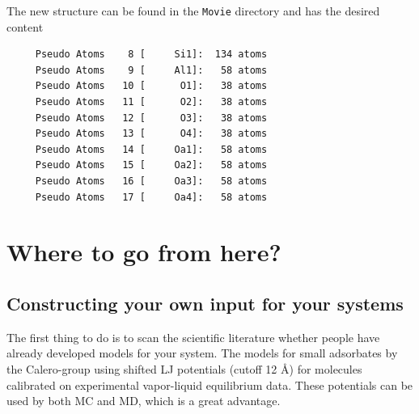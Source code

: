 The new structure can be found in the \verb+Movie+ directory and has the desired content
\begin{tiny}
\begin{verbatim}
     Pseudo Atoms    8 [     Si1]:  134 atoms
     Pseudo Atoms    9 [     Al1]:   58 atoms
     Pseudo Atoms   10 [      O1]:   38 atoms
     Pseudo Atoms   11 [      O2]:   38 atoms
     Pseudo Atoms   12 [      O3]:   38 atoms
     Pseudo Atoms   13 [      O4]:   38 atoms
     Pseudo Atoms   14 [     Oa1]:   58 atoms
     Pseudo Atoms   15 [     Oa2]:   58 atoms
     Pseudo Atoms   16 [     Oa3]:   58 atoms
     Pseudo Atoms   17 [     Oa4]:   58 atoms
\end{verbatim}
\end{tiny}

\newpage
\section{Where to go from here?}

\subsection*{Constructing your own input for your systems}

The first thing to do is to scan the scientific literature whether people have already developed models for your system.
The models for small adsorbates by the Calero-group using shifted LJ potentials (cutoff 12 \AA)
for molecules calibrated on experimental vapor-liquid equilibrium data.
These potentials can be used by both MC and MD, which is a great advantage.

